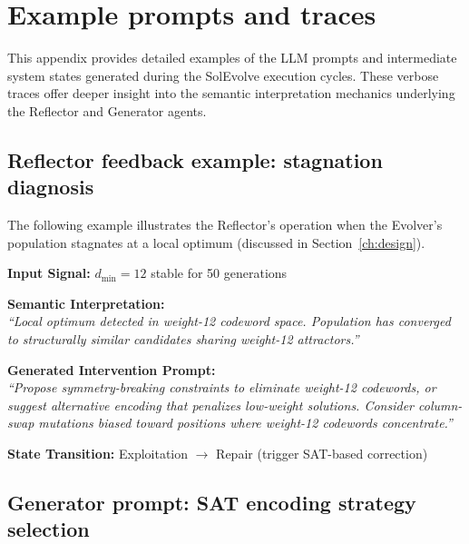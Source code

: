 \section{Example prompts and traces}\label{sec:app_examples}

This appendix provides detailed examples of the LLM prompts and intermediate system states generated during the SolEvolve execution cycles. These verbose traces offer deeper insight into the semantic interpretation mechanics underlying the Reflector and Generator agents.

\subsection{Reflector feedback example: stagnation diagnosis}\label{sec:app_stagnation}

The following example illustrates the Reflector's operation when the Evolver's population stagnates at a local optimum (discussed in Section~\ref{ch:design}).

\begin{tcolorbox}[enhanced, breakable, colback=white, colframe=black, title={Reflector Feedback Example: Stagnation Diagnosis}]
\textbf{Input Signal:} $d_{\min} = 12$ stable for 50 generations

\tcbline

\textbf{Semantic Interpretation:}\\
\textit{``Local optimum detected in weight-12 codeword space. Population has converged to structurally similar candidates sharing weight-12 attractors.''}

\tcbline

\textbf{Generated Intervention Prompt:}\\
\textit{``Propose symmetry-breaking constraints to eliminate weight-12 codewords, or suggest alternative encoding that penalizes low-weight solutions. Consider column-swap mutations biased toward positions where weight-12 codewords concentrate.''}

\tcbline

\textbf{State Transition:} Exploitation $\to$ Repair (trigger SAT-based correction)
\end{tcolorbox}


\subsection{Generator prompt: SAT encoding strategy selection}\label{sec:app_generator}

